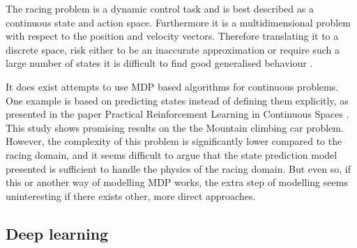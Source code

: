 The racing problem is a dynamic control task and is best described as a continuous state and action space. Furthermore it is a multidimensional problem with respect to the position and velocity vectors. Therefore translating it to a discrete space, risk either to be an inaccurate approximation or require such a large number of states it is difficult to find good generalised behaviour \cite{smart}. 

It does exist attempts to use MDP based algorithms for continuous problems. One example is based on predicting states instead of defining them explicitly, as presented in the paper Practical Reinforcement Learning in Continuous Spaces \cite{smart}. This study shows promising results on the the Mountain climbing car problem. However, the complexity of this problem is significantly lower compared to the racing domain, and it seems difficult to argue that the state prediction model presented is sufficient to handle the physics of the racing domain. But even so, if this or another way of modelling MDP works, the extra step of modelling seems uninteresting if there exists other, more direct approaches.

\subsection{Deep learning}




